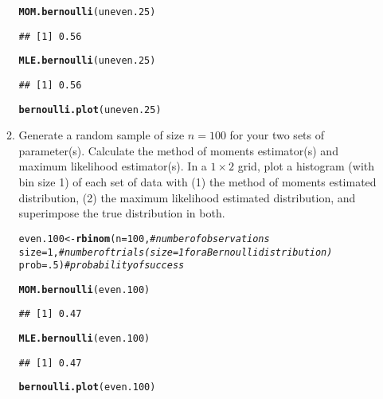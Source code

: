 \documentclass{article}\usepackage[]{graphicx}\usepackage[]{color}
\makeatletter
\newcommand{\hlnum}[1]{\textcolor[rgb]{0.686,0.059,0.569}{#1}}%
\newcommand{\hlcom}[1]{\textcolor[rgb]{0.678,0.584,0.686}{\textit{#1}}}%
\newcommand{\hlstd}[1]{\textcolor[rgb]{0.345,0.345,0.345}{#1}}%
\newcommand{\hlkwb}[1]{\textcolor[rgb]{0.69,0.353,0.396}{#1}}%
\newcommand{\hlkwc}[1]{\textcolor[rgb]{0.333,0.667,0.333}{#1}}%
\newcommand{\hlkwd}[1]{\textcolor[rgb]{0.737,0.353,0.396}{\textbf{#1}}}%
\newenvironment{kframe}{%
 \def\at@end@of@kframe{}%
 \ifinner\ifhmode%
  \def\at@end@of@kframe{\end{minipage}}%
  \begin{minipage}{\columnwidth}%
 \fi\fi%
 \def\FrameCommand##1{\hskip\@totalleftmargin \hskip-\fboxsep
 \colorbox{shadecolor}{##1}\hskip-\fboxsep
     \hskip-\linewidth \hskip-\@totalleftmargin \hskip\columnwidth}%
 \MakeFramed {\advance\hsize-\width
   \@totalleftmargin\z@ \linewidth\hsize
   \@setminipage}}%
 {\par\unskip\endMakeFramed%
 \at@end@of@kframe}
\newenvironment{knitrout}{}{} %
\makeatother
\begin{document}
\begin{enumerate}
\begin{enumerate}
\begin{knitrout}
\begin{kframe}
\begin{alltt}
\hlkwd{MOM.bernoulli}\hlstd{(uneven.25)}
\end{alltt}
\begin{verbatim}
## [1] 0.56
\end{verbatim}
\begin{alltt}
\hlkwd{MLE.bernoulli}\hlstd{(uneven.25)}
\end{alltt}
\begin{verbatim}
## [1] 0.56
\end{verbatim}
\begin{alltt}
\hlkwd{bernoulli.plot}\hlstd{(uneven.25)}
\end{alltt}


{\ttfamily\noindent\bfseries\color{errorcolor}{\#\# Error: Can't add `p2` to a ggplot object.}}\end{kframe}
\end{knitrout}
  \item Generate a random sample of size $n=100$ for your two sets of parameter(s).
  Calculate the method of moments estimator(s) and maximum likelihood estimator(s). 
  In a $1 \times 2$ grid, plot a histogram (with bin size 1) of each set of data 
  with (1) the method of moments estimated distribution, (2) the maximum likelihood
  estimated distribution, and superimpose the true distribution in both.
\begin{knitrout}
\color{fgcolor}\begin{kframe}
\begin{alltt}
\hlstd{even.100} \hlkwb{<-} \hlkwd{rbinom}\hlstd{(}\hlkwc{n}\hlstd{=}\hlnum{100}\hlstd{,}        \hlcom{#number of observations}
                  \hlkwc{size}\hlstd{=}\hlnum{1}\hlstd{,}        \hlcom{#number of trials (size=1 for a Bernoulli distribution)}
                  \hlkwc{prob}\hlstd{=}\hlnum{.5}\hlstd{)}       \hlcom{#probability of success}

\hlkwd{MOM.bernoulli}\hlstd{(even.100)}
\end{alltt}
\begin{verbatim}
## [1] 0.47
\end{verbatim}
\begin{alltt}
\hlkwd{MLE.bernoulli}\hlstd{(even.100)}
\end{alltt}
\begin{verbatim}
## [1] 0.47
\end{verbatim}
\begin{alltt}
\hlkwd{bernoulli.plot}\hlstd{(even.100)}
\end{alltt}



\end{kframe}
\end{knitrout}
\end{enumerate}
\end{enumerate}
\end{document}
